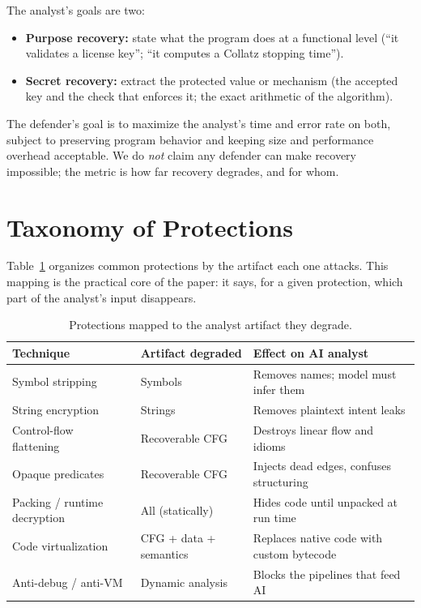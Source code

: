 \documentclass[conference]{IEEEtran}
\begin{document}
The analyst's goals are two:
\begin{itemize}
\item \textbf{Purpose recovery:} state what the program does at a functional
level (``it validates a license key''; ``it computes a Collatz stopping time'').
\item \textbf{Secret recovery:} extract the protected value or mechanism (the
accepted key and the check that enforces it; the exact arithmetic of the
algorithm).
\end{itemize}
The defender's goal is to maximize the analyst's time and error rate on both,
subject to preserving program behavior and keeping size and performance overhead
acceptable. We do \emph{not} claim any defender can make recovery impossible; the
metric is how far recovery degrades, and for whom.

\section{Taxonomy of Protections}\label{sec:taxonomy}
Table~\ref{tab:taxonomy} organizes common protections by the artifact each one
attacks. This mapping is the practical core of the paper: it says, for a given
protection, which part of the analyst's input disappears.

\begin{table}[t]
\caption{Protections mapped to the analyst artifact they degrade.}
\label{tab:taxonomy}
\centering
\footnotesize
\begin{tabular}{@{}p{2.3cm}p{2.0cm}p{2.7cm}@{}}
\toprule
\textbf{Technique} & \textbf{Artifact degraded} & \textbf{Effect on AI analyst} \\
\midrule
Symbol stripping & Symbols & Removes names; model must infer them~\cite{gennm,funcname} \\
String encryption & Strings & Removes plaintext intent leaks \\
Control-flow flattening~\cite{obf-taxonomy,ollvm} & Recoverable CFG & Destroys linear flow and idioms \\
Opaque predicates~\cite{obf-taxonomy} & Recoverable CFG & Injects dead edges, confuses structuring \\
Packing / runtime decryption & All (statically) & Hides code until unpacked at run time \\
Code virtualization & CFG + data + semantics & Replaces native code with custom bytecode \\
Anti-debug / anti-VM & Dynamic analysis & Blocks the pipelines that feed AI \\
\bottomrule
\end{tabular}
\end{table}
\end{document}
